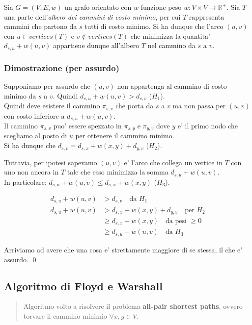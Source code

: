 \documentclass{article}
\begin{document}
Sia $G = (V, E, w)$ un grafo orientato con $w$ funzione peso $w: V \times V \to \mathbb{R}^+$.
Sia $T$ una parte dell'\emph{albero dei cammini di costo minimo}, per cui $T$
rappresenta cammini che partono da $s$ tutti di costo minimo.
Si ha dunque che l'arco $(u, v)$ con $u \in vertices(T)$ e $v \not\in vertices(T)$
che minimizza la quantita' $d_{s,u} + w(u, v)$ appartiene dunque all'albero $T$
nel cammino da $s$ a $v$.

\subsubsection{Dimostrazione (per assurdo)}

Supponiamo per assurdo che $(u, v)$ non appartenga al cammino di costo minimo
da $s$ a $v$. Quindi $d_{s,u} + w(u, v) > d_{s,v}$ ($H_1$). \\
Quindi deve esistere il cammino $\pi_{s,v}$ che porta da $s$ a $v$ ma non passa
per $(u, v)$ con costo inferiore a $d_{s,u} + w(u, v)$. \\
Il cammino $\pi_{s,v}$ puo' essere spezzato in $\pi_{s,y}$ e $\pi_{y,v}$ dove
$y$ e' il primo nodo che scegliamo al posto di $u$ per ottenere il cammino minimo. \\
Si ha dunque che $d_{s,v} = d_{s,x} + w(x, y) + d_{y,v}$ ($H_2$). 

Tuttavia, per ipotesi sapevamo $(u, v)$ e' l'arco che collega un vertice in $T$
con uno non ancora in $T$ tale che esso minimizza la somma $d_{s,u} + w(u, v)$. \\
In particolare: $d_{s,u} + w(u, v) \leq d_{s,x} + w(x, y)$ ($H_3$).

\begin{align*}
  d_{s,u} + w(u, v) &> d_{s, v} \quad \text{da } H_1\\
  d_{s,u} + w(u, v) &> d_{s,x} + w(x, y) + d_{y,v} \quad \text{per } H_2\\
  &\geq d_{s,x} + w(x, y) \quad \text{da pesi } \geq 0\\
  &\geq d_{s,u} + w(u, v) \quad \text{da } H_3
\end{align*}

Arriviamo ad avere che una cosa e' strettamente maggiore di se stessa, il che e' assurdo.
\qed

\subsection{Algoritmo di Floyd e Warshall}

\begin{quote}
  Algoritmo volto a risolvere il problema \textbf{all-pair shortest paths},
  ovvero torvare il cammino minimio $\forall x,y \in V$.
\end{quote}
\end{document}
